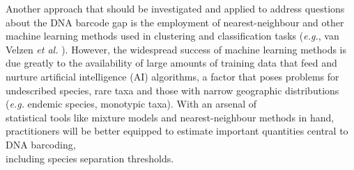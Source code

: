 Another approach that should be investigated and applied to address questions about the DNA barcode gap is the employment of nearest-neighbour and other machine learning methods used in clustering and classification tasks (\textit{e.g.}, van Velzen \textit{et al.}  \cite{vanvelzen2012dna}). However, the widespread success of machine learning methods is due greatly to the availability of large amounts of training data that feed and nurture artificial intelligence (AI) algorithms, a factor that poses problems for undescribed species, rare taxa and those with narrow geographic distributions (\textit{e.g.} endemic species, monotypic taxa). With an arsenal of \\ statistical tools like mixture models and nearest-neighbour methods in hand, practitioners will be better equipped to estimate important quantities central to DNA barcoding, \\ including species separation thresholds.



